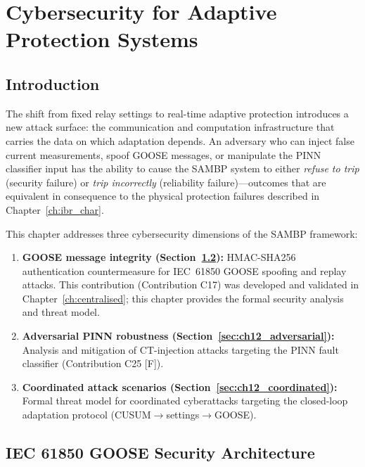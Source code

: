 \chapter{Cybersecurity for Adaptive Protection Systems}
\label{ch:cybersecurity}

\section{Introduction}
\label{sec:ch12_intro}

The shift from fixed relay settings to real-time adaptive protection
introduces a new attack surface: the communication and computation
infrastructure that carries the data on which adaptation depends.
An adversary who can inject false current measurements, spoof GOOSE
messages, or manipulate the PINN classifier input has the ability to
cause the SAMBP system to either \emph{refuse to trip} (security failure)
or \emph{trip incorrectly} (reliability failure)---outcomes that are
equivalent in consequence to the physical protection failures described
in Chapter~\ref{ch:ibr_char}.

This chapter addresses three cybersecurity dimensions of the SAMBP framework:

\begin{enumerate}
\item \textbf{GOOSE message integrity (Section~\ref{sec:ch12_goose}):}
      HMAC-SHA256 authentication countermeasure for IEC~61850 GOOSE
      spoofing and replay attacks. This contribution (Contribution C17)
      was developed and validated in Chapter~\ref{ch:centralised}; this
      chapter provides the formal security analysis and threat model.

\item \textbf{Adversarial PINN robustness (Section~\ref{sec:ch12_adversarial}):}
      Analysis and mitigation of CT-injection attacks targeting the PINN
      fault classifier (Contribution C25 [F]).

\item \textbf{Coordinated attack scenarios (Section~\ref{sec:ch12_coordinated}):}
      Formal threat model for coordinated cyberattacks targeting the
      closed-loop adaptation protocol (CUSUM$\to$settings$\to$GOOSE).
\end{enumerate}

\section{IEC 61850 GOOSE Security Architecture}
\label{sec:ch12_goose}

